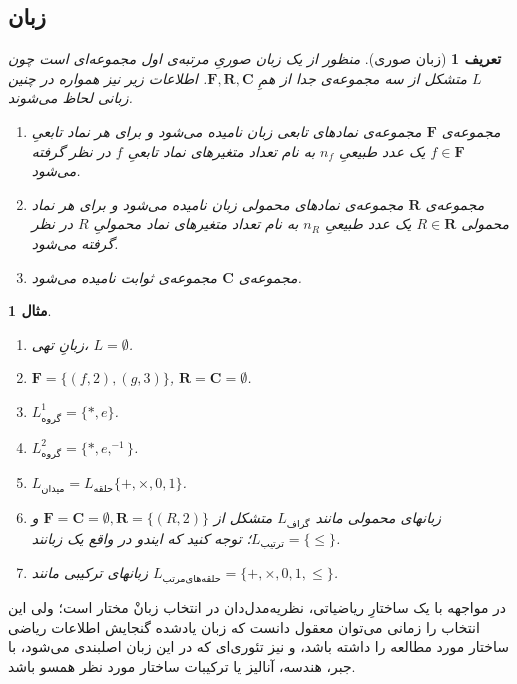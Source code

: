 \documentclass[12pt,a4paper]{report}
\theoremstyle{colorhead}
\newtheorem{mesal}[thm]{مثال}
\newtheorem{defn}[thm]{تعریف}
\begin{document}
\subsection{زبان}
\label{vorud}
\begin{defn}
[زبان صوری]
منظور از یک 
\textit{زبان صوریِ }
مرتبه‌ی اول
مجموعه‌ای است چون
$L$
متشکل از سه مجموعه‌ی جدا از همِ
$\mathbf{F},\mathbf{R},\mathbf{C}$. 
اطلاعات زیر نیز همواره در چنین زبانی لحاظ می‌شوند.
\begin{enumerate}
\item 
مجموعه‌ی
$\mathbf{F}$
مجموعه‌ی نمادهای تابعی زبان نامیده می‌شود و برای هر نماد تابعیِ
$f\in \mathbf{F}$
یک عدد طبیعیِ 
$n_f$
به نام تعداد متغیرهای نماد تابعیِ 
$f$
در نظر گرفته می‌شود. 
\item 
مجموعه‌ی
$\mathbf{R}$
مجموعه‌ی نمادهای محمولی زبان نامیده می‌شود و برای هر نماد محمولی
$R\in \mathbf{R}$
یک عدد طبیعیِ 
$n_R$
به نام تعداد متغیرهای نماد محمولیِ
$R$
در نظر گرفته می‌شود. 
\item 
مجموعه‌ی
$\mathbf{C}$
مجموعه‌ی ثوابت نامیده می‌شود. 
\end{enumerate}
\end{defn}
\begin{mesal}
\begin{enumerate}
\item 
زبانِ تهی،
$L=\emptyset$.
\item 
$\mathbf{F}=\{(f,2),(g,3)\}$, $\mathbf{R}=\mathbf{C}=\emptyset$.
\item 
$L^1_{\text{گروه}}=\{*,e\}$.
\item 
$L^2_{\text{گروه}}=\{*,e,^{-1}\}$.
\item 
$L_{\text{میدان}}=L_{\text{حلقه}}\{+,\times,0,1\}$.
\item 
زبانهای محمولی مانند
$L_{\text{گراف}}$
متشکل از
$\mathbf{F}=\mathbf{C}=\emptyset, \mathbf{R}=\{(R,2)\}$ 
و 
$L_{\text{ترتیب}}=\{\leq\}$؛
توجه کنید که ایندو در واقع یک زبانند.
\item
زبانهای ترکیبی مانند
$L_{\text{حلقه‌های‌مرتب}}=\{+,\times,0,1,\leq\}$.
\end{enumerate}
\end{mesal}
در مواجهه با یک ساختارِ ریاضیاتی، نظریه‌مدل‌دان در 
انتخاب زبانْ مختار است؛ 
ولی
این انتخاب را زمانی می‌توان معقول دانست  که  زبان یادشده گنجایش اطلاعات ریاضی ساختار مورد مطالعه را داشته باشد، و نیز تئوری‌ای که در این زبان اصلبندی می‌شود، 
با جبر،‌ هندسه، آنالیز یا 
ترکیبات ساختار مورد نظر همسو باشد.
\end{document}
